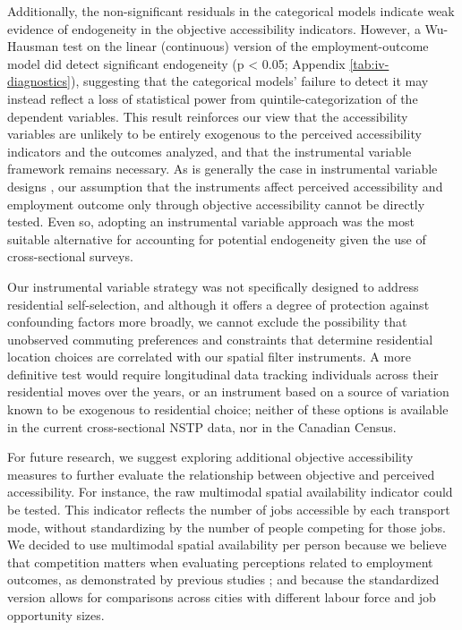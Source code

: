 \documentclass[preprint, 3p,
authoryear]{elsarticle} %
\begin{document}
Additionally, the non-significant residuals in the categorical models
indicate weak evidence of endogeneity in the objective accessibility
indicators. However, a Wu-Hausman test on the linear (continuous)
version of the employment-outcome model did detect significant
endogeneity (p \textless{} 0.05; Appendix \ref{tab:iv-diagnostics}),
suggesting that the categorical models' failure to detect it may instead
reflect a loss of statistical power from quintile-categorization of the
dependent variables. This result reinforces our view that the
accessibility variables are unlikely to be entirely exogenous to the
perceived accessibility indicators and the outcomes analyzed, and that
the instrumental variable framework remains necessary. As is generally
the case in instrumental variable designs
\citep{cunningham2021causal, huntington-klein2021}, our assumption that
the instruments affect perceived accessibility and employment outcome
only through objective accessibility cannot be directly tested. Even so,
adopting an instrumental variable approach was the most suitable
alternative for accounting for potential endogeneity given the use of
cross-sectional surveys.

Our instrumental variable strategy was not specifically designed to
address residential self-selection, and although it offers a degree of
protection against confounding factors more broadly, we cannot exclude
the possibility that unobserved commuting preferences and constraints
that determine residential location choices are correlated with our
spatial filter instruments. A more definitive test would require
longitudinal data tracking individuals across their residential moves
over the years, or an instrument based on a source of variation known to
be exogenous to residential choice; neither of these options is
available in the current cross-sectional NSTP data, nor in the Canadian
Census.

For future research, we suggest exploring additional objective
accessibility measures to further evaluate the relationship between
objective and perceived accessibility. For instance, the raw multimodal
spatial availability indicator could be tested. This indicator reflects
the number of jobs accessible by each transport mode, without
standardizing by the number of people competing for those jobs. We
decided to use multimodal spatial availability per person because we
believe that competition matters when evaluating perceptions related to
employment outcomes, as demonstrated by previous studies
\citep{jin2018, merlin2017, miller2005}; and because the standardized
version allows for comparisons across cities with different labour force
and job opportunity sizes.
\end{document}
